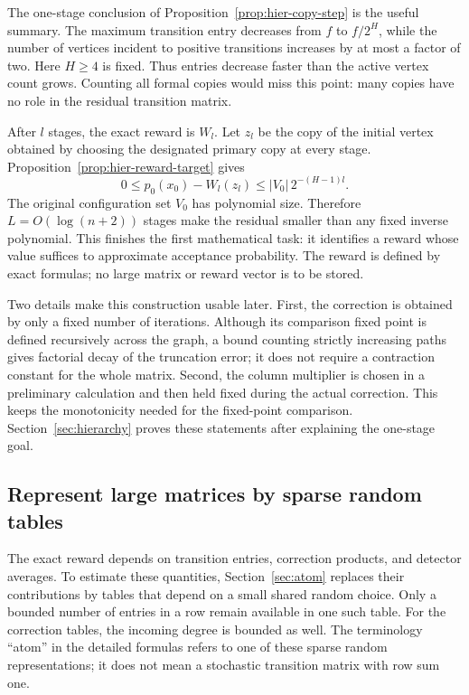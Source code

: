 The one-stage conclusion of Proposition~\ref{prop:hier-copy-step} is the useful summary. The maximum transition entry decreases from $f$ to $f/2^H$, while the number of vertices incident to positive transitions increases by at most a factor of two. Here $H\ge4$ is fixed. Thus entries decrease faster than the active vertex count grows. Counting all formal copies would miss this point: many copies have no role in the residual transition matrix.

After $l$ stages, the exact reward is $W_l$. Let $z_l$ be the copy of the initial vertex obtained by choosing the designated primary copy at every stage. Proposition~\ref{prop:hier-reward-target} gives
\[
 0\le p_0(x_0)-W_l(z_l)\le |V_0|\,2^{-(H-1)l}.
\]
The original configuration set $V_0$ has polynomial size. Therefore $L=O(\log(n+2))$ stages make the residual smaller than any fixed inverse polynomial. This finishes the first mathematical task: it identifies a reward whose value suffices to approximate acceptance probability. The reward is defined by exact formulas; no large matrix or reward vector is to be stored.

Two details make this construction usable later. First, the correction is obtained by only a fixed number of iterations. Although its comparison fixed point is defined recursively across the graph, a bound counting strictly increasing paths gives factorial decay of the truncation error; it does not require a contraction constant for the whole matrix. Second, the column multiplier is chosen in a preliminary calculation and then held fixed during the actual correction. This keeps the monotonicity needed for the fixed-point comparison. Section~\ref{sec:hierarchy} proves these statements after explaining the one-stage goal.

\subsection{Represent large matrices by sparse random tables}

The exact reward depends on transition entries, correction products, and detector averages. To estimate these quantities, Section~\ref{sec:atom} replaces their contributions by tables that depend on a small shared random choice. Only a bounded number of entries in a row remain available in one such table. For the correction tables, the incoming degree is bounded as well. The terminology ``atom'' in the detailed formulas refers to one of these sparse random representations; it does not mean a stochastic transition matrix with row sum one.

